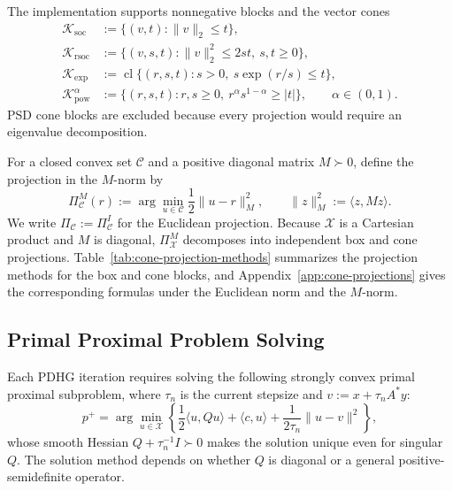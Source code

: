 \documentclass[letterpaper]{article} %
\theoremstyle{definition}
\theoremstyle{remark}
\begin{document}
The implementation supports nonnegative blocks and the vector cones
\begin{align*}
    \mathcal K_{\mathrm{soc}}
    &:=\{(v,t):\|v\|_2\le t\},\\
    \mathcal K_{\mathrm{rsoc}}
    &:=\{(v,s,t):\|v\|_2^2\le2st,\ s,t\ge0\},\\
    \mathcal K_{\mathrm{exp}}
    &:=\operatorname{cl}\{(r,s,t):s>0,\ s\exp(r/s)\le t\},\\
    \mathcal K_{\mathrm{pow}}^\alpha
    &:=\{(r,s,t):r,s\ge0,\ r^\alpha s^{1-\alpha}\ge|t|\},
    \qquad \alpha\in(0,1).
\end{align*}
PSD cone blocks are excluded because every projection would require an
eigenvalue decomposition.

For a closed convex set $\mathcal C$ and a positive diagonal matrix
$M\succ0$, define the projection in the $M$-norm by
\begin{equation}
\label{eq:metric-block-projection}
    \Pi_{\mathcal C}^{M}(r)
    :=
    \arg\min_{u\in\mathcal C}\frac12\|u-r\|_M^2,
    \qquad
    \|z\|_M^2:=\langle z,Mz\rangle.
\end{equation}
We write $\Pi_{\mathcal C}:=\Pi_{\mathcal C}^{I}$ for the Euclidean
projection. Because $\mathcal X$ is a Cartesian product and $M$ is diagonal,
$\Pi_{\mathcal X}^M$ decomposes into independent box and cone projections.
Table~\ref{tab:cone-projection-methods} summarizes the projection methods for
the box and cone blocks, and Appendix~\ref{app:cone-projections} gives the
corresponding formulas under the Euclidean norm and the $M$-norm.

\subsection{Primal Proximal Problem Solving}
\label{sec:conic}
\label{sec:cone-projections}

Each PDHG iteration requires solving the following strongly convex primal
proximal subproblem, where $\tau_n$ is the current stepsize and
$v:=x+\tau_nA^*y$:
\begin{equation}
\label{eq:prox-subproblem}
    p^+
    =
    \arg\min_{u\in\mathcal X}
    \left\{
        \frac12\langle u,Qu\rangle+\langle c,u\rangle
        +\frac{1}{2\tau_n}\|u-v\|^2
    \right\},
\end{equation}
whose smooth Hessian $Q+\tau_n^{-1}I\succ0$ makes the solution unique even
for singular $Q$.  The solution method depends on whether $Q$ is diagonal or
a general positive-semidefinite operator.
\end{document}
